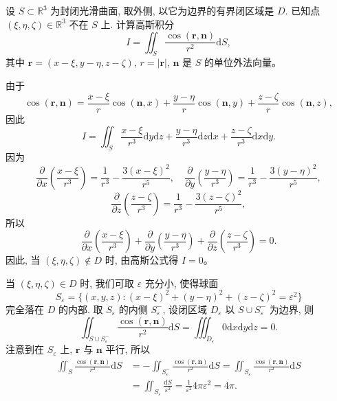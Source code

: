 \documentclass[UTF8,12pt,a4paper,fontset=fandol]{ctexart}
\begin{document}
\begin{example}\label{course-example-16-5-4}\quad 设 $S\subset\mathbb R^3$ 为封闭光滑曲面, 取外侧, 以它为边界的有界闭区域是 $D$. 已知点 $(\xi,\eta,\zeta)\in\mathbb R^3$ 不在 $S$ 上. 计算高斯积分
\[
  I=\iint_S\frac{\cos(\boldsymbol r,\boldsymbol n)}{r^2}\mathrm dS,
\]
其中 $\boldsymbol r=(x-\xi,y-\eta,z-\zeta)$, $r=|\boldsymbol r|$, $\boldsymbol n$ 是 $S$ 的单位外法向量。

\end{example}
\begin{solve}\quad 由于
\[
  \cos(\boldsymbol r,\boldsymbol n)
  =\frac{x-\xi}{r}\cos(\boldsymbol n,x)
   +\frac{y-\eta}{r}\cos(\boldsymbol n,y)
   +\frac{z-\zeta}{r}\cos(\boldsymbol n,z),
\]
因此
\[
  I=\iint_S\frac{x-\xi}{r^3}\mathrm dy\mathrm dz
    +\frac{y-\eta}{r^3}\mathrm dz\mathrm dx
    +\frac{z-\zeta}{r^3}\mathrm dx\mathrm dy.
\]
因为
\[
  \frac{\partial}{\partial x}\left(\frac{x-\xi}{r^3}\right)=\frac1{r^3}-\frac{3(x-\xi)^2}{r^5},\quad
  \frac{\partial}{\partial y}\left(\frac{y-\eta}{r^3}\right)=\frac1{r^3}-\frac{3(y-\eta)^2}{r^5},
\]
\[
  \frac{\partial}{\partial z}\left(\frac{z-\zeta}{r^3}\right)=\frac1{r^3}-\frac{3(z-\zeta)^2}{r^5},
\]
所以
\[
  \frac{\partial}{\partial x}\left(\frac{x-\xi}{r^3}\right)
  +\frac{\partial}{\partial y}\left(\frac{y-\eta}{r^3}\right)
  +\frac{\partial}{\partial z}\left(\frac{z-\zeta}{r^3}\right)=0.
\]
因此, 当 $(\xi,\eta,\zeta)\notin D$ 时, 由高斯公式得 $I=0$。

当 $(\xi,\eta,\zeta)\in D$ 时, 我们可取 $\varepsilon$ 充分小, 使得球面
\[
  S_\varepsilon=\{(x,y,z):(x-\xi)^2+(y-\eta)^2+(z-\zeta)^2=\varepsilon^2\}
\]
完全落在 $D$ 的内部. 取 $S_\varepsilon$ 的内侧 $S_\varepsilon^-$, 设闭区域 $D_\varepsilon$ 以 $S\cup S_\varepsilon^-$ 为边界, 则
\[
  \iint_{S\cup S_\varepsilon^-}\frac{\cos(\boldsymbol r,\boldsymbol n)}{r^2}\mathrm dS
  =\iiint_{D_\varepsilon}0\mathrm dx\mathrm dy\mathrm dz=0.
\]
注意到在 $S_\varepsilon$ 上, $\boldsymbol r$ 与 $\boldsymbol n$ 平行, 所以
\[
\begin{aligned}
  \iint_S\frac{\cos(\boldsymbol r,\boldsymbol n)}{r^2}\mathrm dS
  &=-\iint_{S_\varepsilon^-}\frac{\cos(\boldsymbol r,\boldsymbol n)}{r^2}\mathrm dS
    =\iint_{S_\varepsilon}\frac{\cos(\boldsymbol r,\boldsymbol n)}{r^2}\mathrm dS\\
  &=\iint_{S_\varepsilon}\frac{\mathrm dS}{\varepsilon^2}
    =\frac1{\varepsilon^2}4\pi\varepsilon^2=4\pi.
\end{aligned}
\]

\end{solve}
\end{document}
